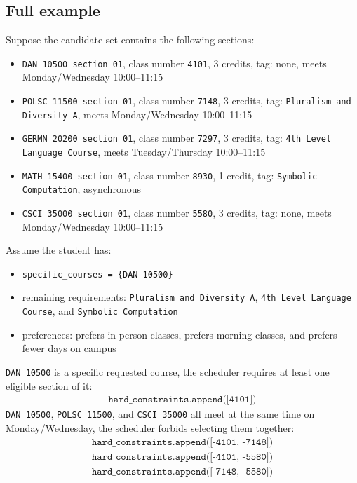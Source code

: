 \documentclass[11pt, a4paper]{article} %
\newcommand{\<}{\langle}
\renewcommand{\>}{\rangle}
\begin{document}
\subsection*{Full example}
Suppose the candidate set contains the following sections:
  \begin{itemize}
    \vspace{-2mm}
    \setlength{\itemsep}{-.2em}
      \item[$\bigstar$] \texttt{DAN 10500 section 01}, class number \texttt{4101}, 3
  credits, tag: none, meets Monday/Wednesday 10:00--11:15
      \item[$\bigstar$] \texttt{POLSC 11500 section 01}, class number \texttt{7148}, 3
  credits, tag: \texttt{Pluralism and Diversity A}, meets Monday/Wednesday
  10:00--11:15
      \item[$\bigstar$] \texttt{GERMN 20200 section 01}, class number \texttt{7297}, 3
  credits, tag: \texttt{4th Level Language Course}, meets Tuesday/Thursday
  10:00--11:15
      \item[$\bigstar$] \texttt{MATH 15400 section 01}, class number \texttt{8930}, 1
  credit, tag: \texttt{Symbolic Computation}, asynchronous
      \item[$\bigstar$] \texttt{CSCI 35000 section 01}, class number \texttt{5580}, 3
  credits, tag: none, meets Monday/Wednesday 10:00--11:15
  \end{itemize}

Assume the student has:

  \begin{itemize}
    \vspace{-2mm}
    \setlength{\itemsep}{-.2em}
      \item[$\bigstar$] \texttt{specific\_courses = \{DAN 10500\}}
      \item[$\bigstar$] remaining requirements: \texttt{Pluralism and Diversity A},
  \texttt{4th Level Language Course}, and \texttt{Symbolic Computation}
      \item[$\bigstar$] preferences: prefers in-person classes, prefers morning classes,
  and prefers fewer days on campus
  \end{itemize}
 \texttt{DAN 10500} is a specific requested course, the scheduler
  requires at least one eligible section of it: \begin{align*}
      \texttt{hard\_constraints.append([4101])}
  \end{align*} 
  \texttt{DAN 10500}, \texttt{POLSC 11500}, and \texttt{CSCI 35000} all
  meet at the same time on Monday/Wednesday, the scheduler forbids selecting
  them together:
  \begin{align*}
      \texttt{hard\_constraints.append([-4101, -7148])}\\
      \texttt{hard\_constraints.append([-4101, -5580])}\\
      \texttt{hard\_constraints.append([-7148, -5580])}
  \end{align*}
\end{document}
